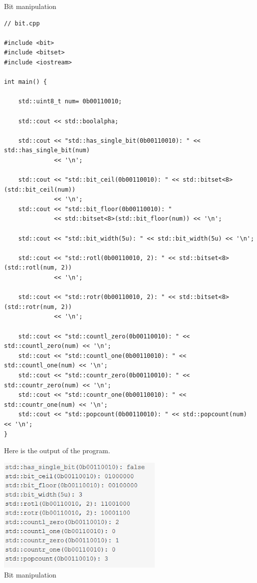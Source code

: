 \noindent
Bit manipulation
\begin{lstlisting}[style=styleCXX]
// bit.cpp

#include <bit>
#include <bitset>
#include <iostream>

int main() {
	
	std::uint8_t num= 0b00110010;
	
	std::cout << std::boolalpha;
	
	std::cout << "std::has_single_bit(0b00110010): " << std::has_single_bit(num)
	          << '\n';
	          
	std::cout << "std::bit_ceil(0b00110010): " << std::bitset<8>(std::bit_ceil(num))
	          << '\n';          
	std::cout << "std::bit_floor(0b00110010): "
	          << std::bitset<8>(std::bit_floor(num)) << '\n';
	
	std::cout << "std::bit_width(5u): " << std::bit_width(5u) << '\n';
	
	std::cout << "std::rotl(0b00110010, 2): " << std::bitset<8>(std::rotl(num, 2))
	          << '\n';
	
	std::cout << "std::rotr(0b00110010, 2): " << std::bitset<8>(std::rotr(num, 2))
	          << '\n';
	          
	std::cout << "std::countl_zero(0b00110010): " << std::countl_zero(num) << '\n';
	std::cout << "std::countl_one(0b00110010): " << std::countl_one(num) << '\n';
	std::cout << "std::countr_zero(0b00110010): " << std::countr_zero(num) << '\n';
	std::cout << "std::countr_one(0b00110010): " << std::countr_one(num) << '\n';
	std::cout << "std::popcount(0b00110010): " << std::popcount(num) << '\n';
}
\end{lstlisting}

Here is the output of the program.

\begin{center}
\includegraphics[width=0.6\textwidth]{content/3/chapter5/images/1-6.png}\\
Bit manipulation
\end{center}

